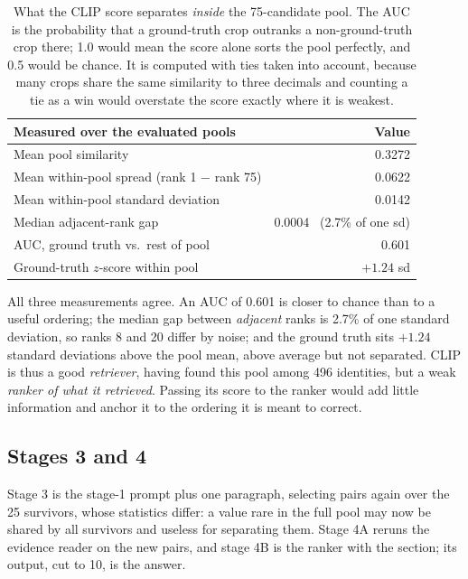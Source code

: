\begin{table}[H]
\centering
\begin{tabular}{@{}lr@{}}
\toprule
\textbf{Measured over the evaluated pools} & \textbf{Value}\\
\midrule
Mean pool similarity                        & 0.3272\\
Mean within-pool spread (rank 1 $-$ rank 75)& 0.0622\\
Mean within-pool standard deviation         & 0.0142\\
Median adjacent-rank gap                    & 0.0004 \ (2.7\% of one sd)\\
AUC, ground truth vs.\ rest of pool         & 0.601\\
Ground-truth $z$-score within pool          & $+1.24$ sd\\
\bottomrule
\end{tabular}
\caption[What the CLIP score separates inside the pool]{What the CLIP score separates \emph{inside} the 75-candidate pool. The AUC
is the probability that a ground-truth crop outranks a non-ground-truth crop there;
1.0 would mean the score alone sorts the pool perfectly, and 0.5 would be chance.
It is computed with ties taken into account, because many crops share the same
similarity to three decimals and counting a tie as a win would overstate the score
exactly where it is weakest.}
\label{tab:r-clipscore}
\end{table}

All three measurements agree. An AUC of 0.601 is closer to chance than to a useful
ordering; the median gap between \emph{adjacent} ranks is 2.7\% of one standard
deviation, so ranks 8 and 20 differ by noise; and the ground truth sits $+1.24$
standard deviations above the pool mean, above average but not separated. CLIP is
thus a good \emph{retriever}, having found this pool among 496 identities, but a
weak \emph{ranker of what it retrieved}. Passing its score to the ranker would add
little information and anchor it to the ordering it is meant to correct.

\subsection{Stages 3 and 4}
Stage 3 is the stage-1 prompt plus one paragraph, selecting pairs again over the
25 survivors, whose statistics differ: a value rare in the full pool may now be
shared by all survivors and useless for separating them. Stage 4A reruns the
evidence reader on the new pairs, and stage 4B is the ranker with the
 section; its output, cut to 10, is the answer.

